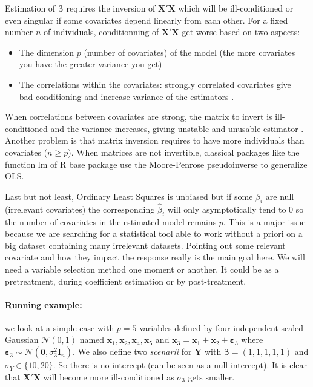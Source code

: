 \documentclass[12pt,a4paper]{report}
\begin{document}
	Estimation of $\boldsymbol{\beta}$ requires the inversion of $\boldsymbol{X}'\boldsymbol{X}$ which will be ill-conditioned or even singular if some covariates depend linearly from each other. 
For a fixed number $n$ of individuals, conditionning of $\boldsymbol{X}'\boldsymbol{X}$ get worse based on two aspects: 
\begin{itemize}
	\item The dimension $p$ (number of covariates) of the model (the more covariates you have the greater variance you get)
	\item The correlations within the covariates: strongly correlated covariates give bad-conditioning and increase variance of the estimators .
\end{itemize}
	When correlations between covariates are strong, the matrix to invert is ill-conditioned and the variance increases, giving unstable and unusable estimator \cite{hoerl1970ridge}.
	Another problem is that matrix inversion requires to have more individuals than covariates ($n\geq p$).
	When matrices are not invertible, classical packages like the function lm of R base package \cite{packagebase} use the Moore-Penrose pseudoinverse \cite{PSP:2043984} to generalize OLS.
		
		
	Last but not least, Ordinary Least Squares is unbiased but if some $\beta_i$ are null (irrelevant covariates) the corresponding $\hat{\beta}_i$ will only asymptotically tend to 0 so the number of covariates in the estimated model remains $p$. This is a major issue because we are searching for a statistical tool able to work without a priori on a big dataset containing many irrelevant datasets. Pointing out some relevant covariate and how they impact the response really is the main goal here. We will need a variable selection method one moment or another. It could be as a pretreatment, during coefficient estimation or by post-treatment.
	
\paragraph{Running example:} we look at a simple case with $p=5$ variables defined by four independent scaled Gaussian $\mathcal{N}(0,1)$ named $\boldsymbol{x}_1,\boldsymbol{x}_2,\boldsymbol{x}_4,\boldsymbol{x}_5$ and $\boldsymbol{x}_3=\boldsymbol{x}_1+\boldsymbol{x}_2+\boldsymbol{\varepsilon}_3$ where $\boldsymbol{\varepsilon}_3\sim{\mathcal{N}(\boldsymbol{0},\sigma_3^2\boldsymbol{I}_n)}$. We also define two {\it scenarii} for $\boldsymbol{Y}$ with $\boldsymbol{\beta}=(1,1,1,1,1)$ and $\sigma_Y \in \{10,20\}$. So there is no intercept (can be seen as a null intercept).
It is clear that $\boldsymbol{X}'\boldsymbol{X}$ will become more ill-conditioned as $\sigma_3$ gets smaller.
	
\end{document}
